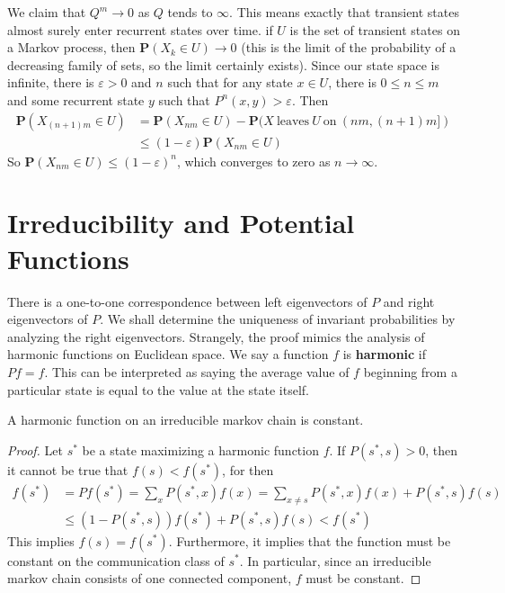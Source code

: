 We claim that $Q^m \to 0$ as $Q$ tends to $\infty$. This means exactly that transient states almost surely enter recurrent states over time. if $U$ is the set of transient states on a Markov process, then $\mathbf{P}(X_k \in U) \to 0$ (this is the limit of the probability of a decreasing family of sets, so the limit certainly exists). Since our state space is infinite, there is $\varepsilon > 0$ and $n$ such that for any state $x \in U$, there is $0 \leq n \leq m$ and some recurrent state $y$ such that $P^n(x,y) > \varepsilon$. Then
%
\begin{align*}
    \mathbf{P}(X_{(n+1)m} \in U) &= \mathbf{P}(X_{nm} \in U) - \mathbf{P}(X\ \text{leaves}\ U\ \text{on}\ (nm,(n+1)m])\\
    &\leq (1 - \varepsilon) \mathbf{P}(X_{nm} \in U)
\end{align*}
%
So $\mathbf{P}(X_{nm} \in U) \leq (1 - \varepsilon)^n$, which converges to zero as $n \to \infty$.

\section{Irreducibility and Potential Functions}

There is a one-to-one correspondence between left eigenvectors of $P$ and right eigenvectors of $P$. We shall determine the uniqueness of invariant probabilities by analyzing the right eigenvectors. Strangely, the proof mimics the analysis of harmonic functions on Euclidean space. We say a function $f$ is {\bf harmonic} if $Pf = f$. This can be interpreted as saying the average value of $f$ beginning from a particular state is equal to the value at the state itself.

\begin{lemma}
    A harmonic function on an irreducible markov chain is constant.
\end{lemma}
\begin{proof}
    Let $s^*$ be a state maximizing a harmonic function $f$. If $P(s^*, s) > 0$, then it cannot be true that $f(s) < f(s^*)$, for then
    \begin{align*}
        f(s^*) &= Pf(s^*) = \sum_x P(s^*,x) f(x) = \sum_{x \neq s} P(s^*,x) f(x) + P(s^*,s) f(s)\\
        &\leq (1 - P(s^*,s)) f(s^*) + P(s^*,s) f(s) < f(s^*)
    \end{align*}
    This implies $f(s) = f(s^*)$. Furthermore, it implies that the function must be constant on the communication class of $s^*$. In particular, since an irreducible markov chain consists of one connected component, $f$ must be constant.
\end{proof}

